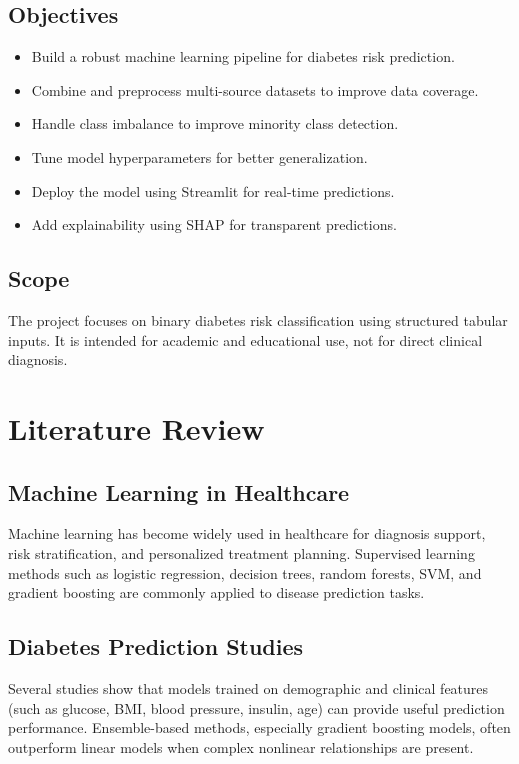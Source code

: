 \documentclass[12pt,a4paper]{report}
\begin{document}
\section{Objectives}
\begin{itemize}[leftmargin=1.2cm]
    \item Build a robust machine learning pipeline for diabetes risk prediction.
    \item Combine and preprocess multi-source datasets to improve data coverage.
    \item Handle class imbalance to improve minority class detection.
    \item Tune model hyperparameters for better generalization.
    \item Deploy the model using Streamlit for real-time predictions.
    \item Add explainability using SHAP for transparent predictions.
\end{itemize}

\section{Scope}
The project focuses on binary diabetes risk classification using structured tabular inputs. It is intended for academic and educational use, not for direct clinical diagnosis.

\chapter{Literature Review}

\section{Machine Learning in Healthcare}
Machine learning has become widely used in healthcare for diagnosis support, risk stratification, and personalized treatment planning. Supervised learning methods such as logistic regression, decision trees, random forests, SVM, and gradient boosting are commonly applied to disease prediction tasks.

\section{Diabetes Prediction Studies}
Several studies show that models trained on demographic and clinical features (such as glucose, BMI, blood pressure, insulin, age) can provide useful prediction performance. Ensemble-based methods, especially gradient boosting models, often outperform linear models when complex nonlinear relationships are present.
\end{document}
